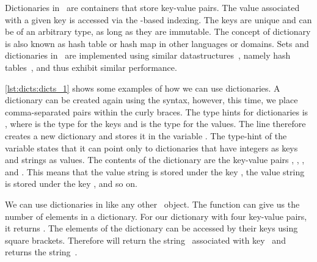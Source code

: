 %
\label{sec:dictionaries}%
%
%
%
Dictionaries in \python\ are containers that store key-value pairs.
The value associated with a given key is accessed via the \pythonil{[...]}\pythonIdx{[\idxdots]}-based indexing.
The keys are unique and can be of an arbitrary type, as long as they are immutable.
The concept of dictionary is also known as hash table or hash map in other languages or domains.
Sets and dictionaries in \python\ are implemented using similar datastructures~\cite{B2023T}, namely hash tables~\cite{K1998SAS,CLRS2009ITA,SKS2019DSC}, and thus exhibit similar performance.%
%
\begin{sloppypar}%
\cref{lst:dicts:dicts_1} shows some examples of how we can use dictionaries.
A dictionary can be created again using the  syntax, however, this time, we place comma-separated  pairs within the curly braces.
The type hints for dictionaries is , where  is the type for the keys and  is the type for the values.
The line  therefore creates a new dictionary and stores it in the variable .
The type-hint of the variable states that it can point only to dictionaries that have integers as keys and strings as values.
The contents of the dictionary are the key-value pairs , , , and .
This means that the value string  is stored under the key , the value string  is stored under the key , and so on.%
\end{sloppypar}%
%
We can use dictionaries in  like any other \python\ object.
The function  can give us the number of elements in a dictionary.
For our dictionary  with four key-value pairs, it returns .
The elements of the dictionary can be accessed by their keys using square brackets.
Therefore  will return the string~ associated with key~ and  returns the string~.%
%
